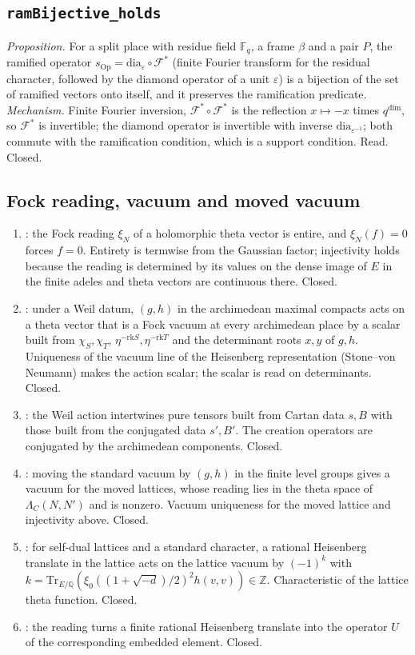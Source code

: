 \documentclass[10pt]{article}
\newcommand{\Q}{\mathbb{Q}}
\newcommand{\Z}{\mathbb{Z}}
\begin{document}
\subsection{\texttt{ramBijective\_holds}}
\emph{Proposition.} For a split place with residue field $\mathbb F_q$, a frame $\beta$ and a pair $P$, the ramified operator $s_{\mathrm{Op}}=\mathrm{dia}_\varepsilon\circ\mathcal F^*$ (finite Fourier transform for the residual character, followed by the diamond operator of a unit $\varepsilon$) is a bijection of the set of ramified vectors onto itself, and it preserves the ramification predicate. \emph{Mechanism.} Finite Fourier inversion, $\mathcal F^*\circ\mathcal F^*$ is the reflection $x\mapsto -x$ times $q^{\dim}$, so $\mathcal F^*$ is invertible; the diamond operator is invertible with inverse $\mathrm{dia}_{\varepsilon^{-1}}$; both commute with the ramification condition, which is a support condition. Read. Closed.

\subsection{Fock reading, vacuum and moved vacuum}
\begin{enumerate}[nosep]
\item {}: the Fock reading $\xi_N$ of a holomorphic theta vector is entire, and $\xi_N(f)=0$ forces $f=0$. Entirety is termwise from the Gaussian factor; injectivity holds because the reading is determined by its values on the dense image of $E$ in the finite adeles and theta vectors are continuous there. Closed.
\item {}: under a Weil datum, $(g,h)$ in the archimedean maximal compacts acts on a theta vector that is a Fock vacuum at every archimedean place by a scalar built from $\chi_S,\chi_T$, $\eta^{-\mathrm{rk}S},\eta^{-\mathrm{rk}T}$ and the determinant roots $x,y$ of $g,h$. Uniqueness of the vacuum line of the Heisenberg representation (Stone--von Neumann) makes the action scalar; the scalar is read on determinants. Closed.
\item {}: the Weil action intertwines pure tensors built from Cartan data $s,B$ with those built from the conjugated data $s',B'$. The creation operators are conjugated by the archimedean components. Closed.
\item {}: moving the standard vacuum by $(g,h)$ in the finite level groups gives a vacuum for the moved lattices, whose reading lies in the theta space of $\Lambda_C(N,N')$ and is nonzero. Vacuum uniqueness for the moved lattice and injectivity above. Closed.
\item {}: for self-dual lattices and a standard character, a rational Heisenberg translate in the lattice acts on the lattice vacuum by $(-1)^k$ with $k=\mathrm{Tr}_{E/\Q}(\xi_0((1+\sqrt{-d})/2)^2 h(v,v))\in\Z$. Characteristic of the lattice theta function. Closed.
\item {}: the reading turns a finite rational Heisenberg translate into the operator $U$ of the corresponding embedded element. Closed.
\end{enumerate}
\end{document}
